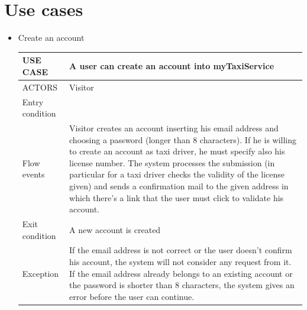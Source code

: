 \section {Use cases}
\begin{itemize}
\item Create an account
	\begin{center}
    	\begin{tabular}{ | l | p{11cm} |}
    	\hline
   	USE CASE & A user can create an account into myTaxiService \\ \hline
    	ACTORS & Visitor \\ \hline
     	Entry condition &  \\ \hline
     	Flow events & Visitor creates an account inserting his email address and choosing a password (longer than 8 characters). If he is willing to create an account as taxi driver, he must specify also his license number. The system processes the submission (in particular for a taxi driver checks the validity of the license given) and sends a confirmation mail to the given address in which there’s a link that the user must click to validate his account. \\ \hline
     	Exit condition & A new account is created \\ \hline
     	Exception &  If the email address is not correct or the user doesn’t confirm his account, the system will not consider any request from it. If the email address already belongs to an existing account or the password is shorter than 8 characters, the system gives an error before the user can continue.\\ \hline
    \end{tabular}
	\end{center}
	

\end{itemize}
